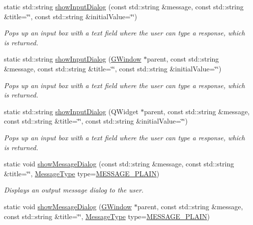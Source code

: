 \begin{DoxyCompactItemize}
static std\+::string \mbox{\hyperlink{classGOptionPane_a50fdc381453e6b8c495e3f9fe07b7bec}{show\+Input\+Dialog}} (const std\+::string \&message, const std\+::string \&title=\char`\"{}\char`\"{}, const std\+::string \&initial\+Value=\char`\"{}\char`\"{})
\begin{DoxyCompactList}\small\item\em Pops up an input box with a text field where the user can type a response, which is returned. \end{DoxyCompactList}\item 
static std\+::string \mbox{\hyperlink{classGOptionPane_a035a6d874c9e81773e7c61305dbecabb}{show\+Input\+Dialog}} (\mbox{\hyperlink{classGWindow}{G\+Window}} $\ast$parent, const std\+::string \&message, const std\+::string \&title=\char`\"{}\char`\"{}, const std\+::string \&initial\+Value=\char`\"{}\char`\"{})
\begin{DoxyCompactList}\small\item\em Pops up an input box with a text field where the user can type a response, which is returned. \end{DoxyCompactList}\item 
static std\+::string \mbox{\hyperlink{classGOptionPane_aabd3a04a3cdc998ee0e7e7e31676df17}{show\+Input\+Dialog}} (Q\+Widget $\ast$parent, const std\+::string \&message, const std\+::string \&title=\char`\"{}\char`\"{}, const std\+::string \&initial\+Value=\char`\"{}\char`\"{})
\begin{DoxyCompactList}\small\item\em Pops up an input box with a text field where the user can type a response, which is returned. \end{DoxyCompactList}\item 
static void \mbox{\hyperlink{classGOptionPane_af4df9c721d9e832e17953c9465bfd9ea}{show\+Message\+Dialog}} (const std\+::string \&message, const std\+::string \&title=\char`\"{}\char`\"{}, \mbox{\hyperlink{classGOptionPane_ac6606ebe91c8ac66a2c314c79f5ab013}{Message\+Type}} type=\mbox{\hyperlink{classGOptionPane_ac6606ebe91c8ac66a2c314c79f5ab013ac03a17c74c589b004d166532958a6196}{M\+E\+S\+S\+A\+G\+E\+\_\+\+P\+L\+A\+IN}})
\begin{DoxyCompactList}\small\item\em Displays an output message dialog to the user. \end{DoxyCompactList}\item 
static void \mbox{\hyperlink{classGOptionPane_ac3ad66eb6ee62ad9140d04e38440e782}{show\+Message\+Dialog}} (\mbox{\hyperlink{classGWindow}{G\+Window}} $\ast$parent, const std\+::string \&message, const std\+::string \&title=\char`\"{}\char`\"{}, \mbox{\hyperlink{classGOptionPane_ac6606ebe91c8ac66a2c314c79f5ab013}{Message\+Type}} type=\mbox{\hyperlink{classGOptionPane_ac6606ebe91c8ac66a2c314c79f5ab013ac03a17c74c589b004d166532958a6196}{M\+E\+S\+S\+A\+G\+E\+\_\+\+P\+L\+A\+IN}})

\end{DoxyCompactItemize}
